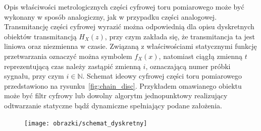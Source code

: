 Opis właściwości metrologicznych części cyfrowej toru pomiarowego może być wykonany w sposób analogiczny, jak w przypadku części analogowej. Transmitancję części cyfrowej wyrazić można odpowiednią dla opisu dyskretnych obiektów transmitancją $H_{X}(z)$, przy czym zakłada się, że transmitancja ta jest liniowa oraz niezmienna w czasie. Związaną z właściwościami statycznymi funkcję przetwarzania oznaczyć można symbolem $f_{X}(x)$, natomiast ciągłą zmienną $t$ reprezentującą czas należy zastąpić zmienną $i$, oznaczającą numer próbki sygnału, przy czym $i \in \mathbb{N}$. Schemat ideowy cyfrowej części toru pomiarowego przedstawiono na rysunku~\ref{fig:chain_disc}. Przykładem omawianego obiektu może być filtr cyfrowy lub dowolny algorytm jednopunktowy realizujący odtwarzanie statyczne bądź dynamiczne spełniający podane założenia.

\begin{figure}[htb!]
\begin{center}
\texttt{[image: obrazki/schemat\_dyskretny]}
\end{center}
\end{figure}

